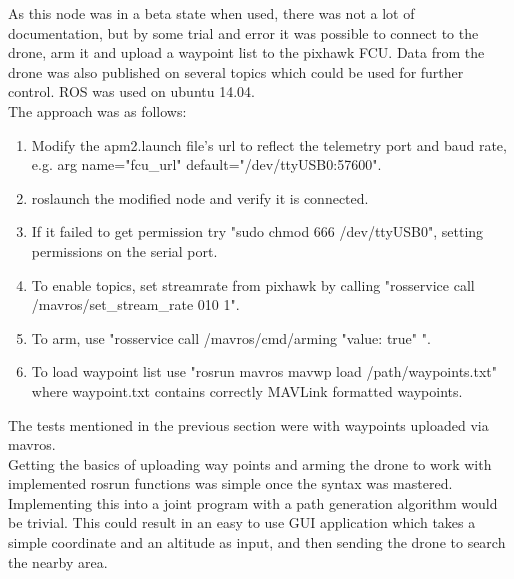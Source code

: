As this node was in a beta state when used, there was not a lot of documentation, but by some trial
and error it was possible to connect to the drone, arm it and upload a waypoint list to the
pixhawk FCU. Data from the drone was also published on several topics which could be used for further
control. ROS was used on ubuntu 14.04.\\
The approach was as follows:
\begin{enumerate}
\item Modify the apm2.launch file's url to reflect the telemetry port and baud rate, e.g. arg
name="fcu\_url" default="/dev/ttyUSB0:57600".
\item roslaunch the modified node and verify it is connected.
\item If it failed to get permission try "sudo chmod 666 /dev/ttyUSB0", setting permissions on the serial port.
\item To enable topics, set streamrate from pixhawk by calling "rosservice call /mavros/set\_stream\_rate
010 1".
\item To arm, use "rosservice call /mavros/cmd/arming "value: true" ".
\item To load waypoint list use "rosrun mavros mavwp load /path/waypoints.txt" where
waypoint.txt contains correctly MAVLink formatted waypoints.
\end{enumerate}

The tests mentioned in the previous section were with waypoints uploaded via mavros.\\%
Getting the basics of uploading way points and arming the drone to work with implemented rosrun
functions was simple once the syntax was mastered.
Implementing this into a joint program with a
path generation algorithm would be trivial.
This could result in an easy to use GUI application
which takes a simple coordinate and an altitude as input,
and then sending the drone to search the nearby area.

